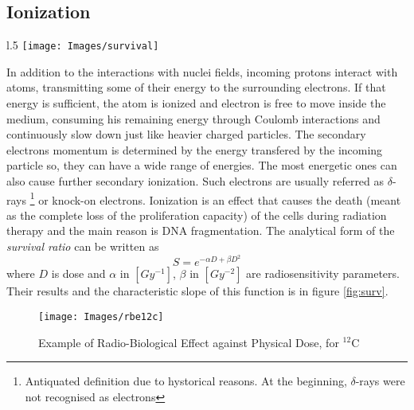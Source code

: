 \documentclass[12pt, a4paper, twoside]{book}
\begin{document}
\subsection{Ionization}
\begin{wrapfigure}{l}{.5\textwidth}
\vspace{-6mm}
\centering
{\texttt{[image: Images/survival]}}
\caption{CHO cells Survival ratio realted with sose, for $X$-rays and $^{12}$C ions. From Weyrather (et al.) \cite{weyr:rbe}}
\label{fig:surv}
\vspace{-10mm}
\end{wrapfigure}
In addition to the interactions with nuclei fields, incoming protons interact with atoms, transmitting some of their energy to the surrounding electrons. If that energy is sufficient, the atom is ionized and electron is free to move inside the medium, consuming his remaining energy through Coulomb interactions and continuously slow down just like heavier charged particles. The secondary electrons momentum is determined by the energy transfered by the incoming particle so, they can have a wide range of energies. The most energetic ones can also cause further secondary ionization. 
Such electrons are usually referred as $\delta$-rays \footnote{Antiquated definition due to hystorical reasons. At the beginning, $\delta$-rays were not recognised as electrons} or knock-on electrons.
Ionization is an effect that causes the death (meant as the complete loss of the proliferation capacity) of the cells during radiation therapy and the main reason is DNA fragmentation. The analytical form of the \emph{survival ratio} can be written as
\[
S = e^{-\alpha D + \beta D^2}
\]
where $D$ is dose and $\alpha$ in $[Gy^{-1}]$, $\beta$ in $[Gy^{-2}]$ are radiosensitivity parameters.
Their results and the characteristic slope of this function is in figure \ref{fig:surv}.
\begin{figure}[!t]
\texttt{[image: Images/rbe12c]}
\caption{Example of Radio-Biological Effect against Physical Dose, for $^{12}$C}
\label{fig:rbe12c}
\end{figure}
\end{document}
